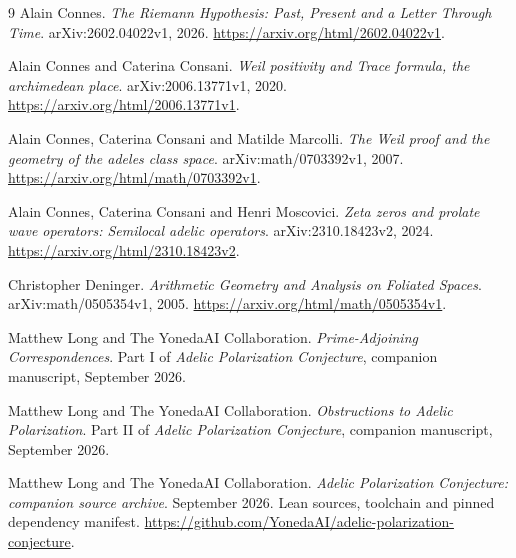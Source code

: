 \documentclass[11pt,letterpaper]{article}
\theoremstyle{definition}
\theoremstyle{remark}
\begin{document}
\begin{thebibliography}{9}
\small
{}
Alain Connes.
\emph{The Riemann Hypothesis: Past, Present and a Letter Through Time}.
arXiv:2602.04022v1, 2026.
\url{https://arxiv.org/html/2602.04022v1}.

Alain Connes and Caterina Consani.
\emph{Weil positivity and Trace formula, the archimedean place}.
arXiv:2006.13771v1, 2020.
\url{https://arxiv.org/html/2006.13771v1}.

Alain Connes, Caterina Consani and Matilde Marcolli.
\emph{The Weil proof and the geometry of the adeles class space}.
arXiv:math/0703392v1, 2007.
\url{https://arxiv.org/html/math/0703392v1}.

Alain Connes, Caterina Consani and Henri Moscovici.
\emph{Zeta zeros and prolate wave operators: Semilocal adelic operators}.
arXiv:2310.18423v2, 2024.
\url{https://arxiv.org/html/2310.18423v2}.

Christopher Deninger.
\emph{Arithmetic Geometry and Analysis on Foliated Spaces}.
arXiv:math/0505354v1, 2005.
\url{https://arxiv.org/html/math/0505354v1}.

Matthew Long and The YonedaAI Collaboration.
\emph{Prime-Adjoining Correspondences}.
Part I of \emph{Adelic Polarization Conjecture}, companion manuscript,
September 2026.

Matthew Long and The YonedaAI Collaboration.
\emph{Obstructions to Adelic Polarization}.
Part II of \emph{Adelic Polarization Conjecture}, companion manuscript,
September 2026.

Matthew Long and The YonedaAI Collaboration.
\emph{Adelic Polarization Conjecture: companion source archive}.
September 2026. Lean sources, toolchain and pinned dependency manifest.
\url{https://github.com/YonedaAI/adelic-polarization-conjecture}.
\end{thebibliography}
\end{document}

